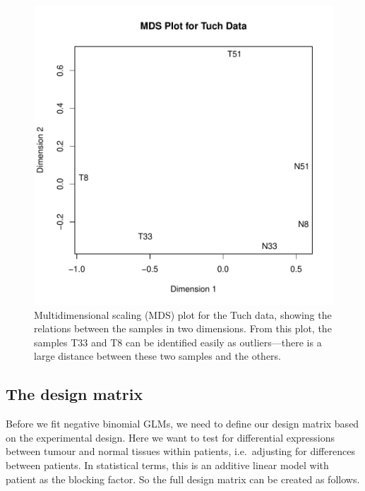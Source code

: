 \begin{figure}[ht]
\begin{center}
\includegraphics[height=0.45\textheight]{edgeR_case_study_Tuch_MDSplot}
\caption{Multidimensional scaling (MDS) plot for the Tuch data,
  showing the relations between the samples in two dimensions. From
  this plot, the samples T33 and T8 can be identified easily as outliers---there is a large distance between these two samples and the others.}
\label{fig:Tuch_MDS}
\end{center}
\end{figure}

\subsection{The design matrix}

Before we fit negative binomial GLMs, we need to define our design
matrix based on the experimental design. Here we want to test for
differential expressions between tumour and normal tissues within
patients, i.e.~adjusting for differences between patients. In
statistical terms, this is an additive linear model with patient as
the blocking factor. So the full design matrix can be created as
follows.

